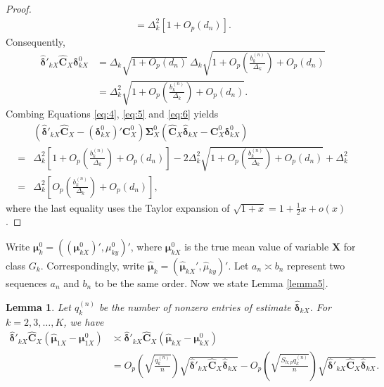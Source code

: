 \documentclass[12pt]{article}
\newtheorem{lemma}{Lemma}%
\begin{document}
\begin{proof}{}{}
\begin{align}
= \Delta_k^2 [1 + O_p(d_n)].
\end{align}
Consequently,
\begin{align}\label{eq:6}
\hat{\bm \delta}'_{kX} \hat{\bm C}_X \bm \delta_{kX}^0 &= \Delta_k \sqrt{1 + O_p(d_n)}~\Delta_k \sqrt{1 + O_p(\frac{b_k^{(n)}}{\Delta_k}) + O_p(d_n)}      \nonumber   \\
&= \Delta_k^2 \sqrt{1 + O_p(\frac{b_k^{(n)}}{\Delta_k}) + O_p(d_n)}.
\end{align}
Combing Equations \eqref{eq:4}, \eqref{eq:5} and \eqref{eq:6} yields
\begin{align*}
&(\hat{\bm \delta}'_{kX} \hat{\bm C}_X - (\bm \delta_{kX}^0)' \bm C_X^0) \bm \Sigma_X^0 (\hat{\bm C}_X \hat{\bm \delta}_{kX} - \bm C_X^0 \bm \delta_{kX}^0)   \\
=& \Delta_k^2 [1 + O_p(\frac{b_k^{(n)}}{\Delta_k}) + O_p(d_n)] - 2 \Delta_k^2 \sqrt{1 + O_p(\frac{b_k^{(n)}}{\Delta_k}) + O_p(d_n)} + \Delta_k^2 \\
=& \Delta_k^2 \left[ O_p(\frac{b_k^{(n)}}{\Delta_k}) + O_p(d_n) \right],
\end{align*}
where the last equality uses the Taylor expansion of $\sqrt{1 + x} = 1 + \frac{1}{2} x + o(x)$.
\end{proof}


Write $\bm \mu_k^0 = ((\bm \mu_{kX}^0)', \mu_{ky}^0)'$, where $\bm \mu_{kX}^0$ is the true mean value of variable $\bm X$ for class $G_k$.
Correspondingly, write $\hat{\bm \mu}_k = (\hat{\bm \mu}_{kX}', \hat{ \mu}_{ky})'$. Let $a_n \asymp b_n$ represent two sequences $a_n$ and $b_n$ to be the same order.
Now we state Lemma \ref{lemma5}.


\begin{lemma}{}{\label{lemma5}}
Let $q_k^{(n)}$ be the number of nonzero entries of estimate $\hat{\bm \delta}_{kX}$.
For $k = 2, 3, \ldots, K$, we have
\begin{align*}
\hat{\bm \delta}'_{kX} \hat{\bm C}_X (\hat{\bm \mu}_{1X} - \bm \mu_{1X}^0) & \asymp \hat{\bm \delta}'_{kX} \hat{\bm C}_X (\hat{\bm \mu}_{kX} - \bm \mu_{kX}^0) \\
&= O_p(\sqrt{\frac{q_k^{(n)}}{n}}) \sqrt{\hat{\bm \delta}'_{kX} \hat{\bm C}_X \hat{\bm \delta}_{kX}} - O_p(\sqrt{\frac{S_{h;p} q_k^{(n)}}{n}}) \sqrt{\hat{\bm \delta}'_{kX} \hat{\bm C}_X \hat{\bm \delta}_{kX}}.
\end{align*}
\end{lemma}
\end{document}
